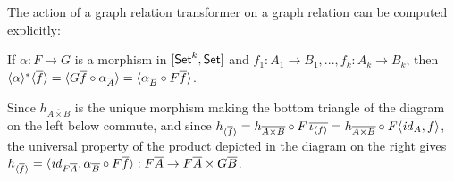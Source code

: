 \documentclass{lmcs}
\theoremstyle{plain}\newtheorem{satz}[thm]{Satz}
\newcommand{\set}{\mathsf{Set}}
\renewcommand{\id}{\mathit{id}}
\begin{document}
\begin{comment}
Just as the equality relation $\Eq_B$ on a set $B$ coincides with
$\graph{\id_B}$, the graph of the identity on the set, so we can
define the equality relation transformer to be the graph of the
identity natural transformation. This gives

\begin{defi}
Let $F : [\set^k, \set]$.  The equality relation transformer on $F$ is
defined to be $\Eq_F = \graph{\id_{F}}$. This entails that $Eq_F = (F,
F, \Eq_F^*)$ with $\Eq_F^* = \graph{\id_{F}}^*$.
\end{defi}
\end{comment}

The action of a graph relation transformer on a graph relation can be
computed explicitly:  

\begin{lem}\label{lem:eq-reln-equalities}
If $\alpha : F \to G$ is a morphism in $[\mathsf{Set}^k, \mathsf{Set}]$
and $f_1: A_1 \to B_1, ..., f_k : A_k \to B_k$,
then $\langle {\alpha} \rangle^* \langle {\overline{f}} \rangle
= \langle G \overline{f} \circ \alpha_{\overline{A}} \rangle
= \langle \alpha_{\overline{B}} \circ F \overline{f} \rangle$.
\end{lem}
\proof
Since $h_{\overline{A \times B}}$ is the unique morphism making the
bottom triangle of the diagram on the left below commute, and since
$h_{\graph{\overline{f}}} = h_{\overline{A \times B}} \circ F
\,\ol{\iota_{\graph{f}}} = h_{\overline{A \times B}} \circ F
\overline{\langle \id_A, f \rangle}$, the universal property of the
product depicted in the diagram on the right gives
$h_{\graph{\overline{f}}} = \langle \id_{F \ol{A}}, \alpha_{\ol{B}}
\circ F\ol{f} \rangle : F \ol{A} \to F \ol{A} \times G \ol{B}$.
\end{document}

